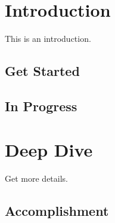 \documentclass[a4paper,12pt]{book}
\begin{document}
    \chapter{Introduction}
    This is an introduction.

    \section{Get Started}
    \blindtext[3]

    \section{In Progress}
    \blindtext[3]

    \chapter{Deep Dive}
    Get more details.

    \section{Accomplishment}
    \blindtext[3]
\end{document}
